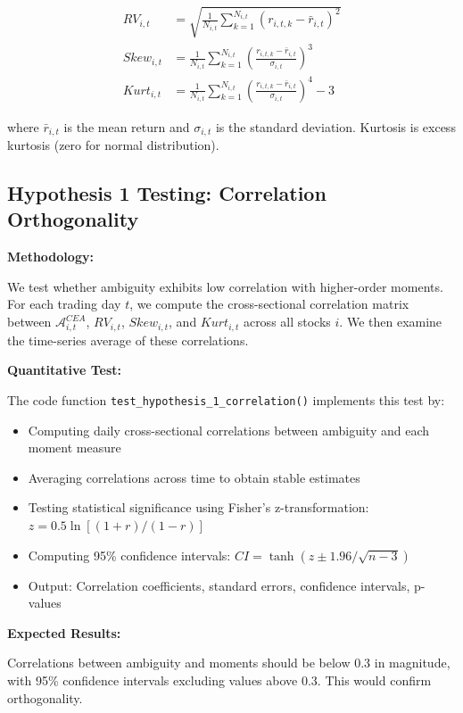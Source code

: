 \documentclass[preprint,12pt,authoryear]{elsarticle}
\begin{document}
\begin{align}
RV_{i,t} &= \sqrt{\frac{1}{N_{i,t}} \sum_{k=1}^{N_{i,t}} (r_{i,t,k} - \bar{r}_{i,t})^2} \\
Skew_{i,t} &= \frac{1}{N_{i,t}} \sum_{k=1}^{N_{i,t}} \left(\frac{r_{i,t,k} - \bar{r}_{i,t}}{\sigma_{i,t}}\right)^3 \\
Kurt_{i,t} &= \frac{1}{N_{i,t}} \sum_{k=1}^{N_{i,t}} \left(\frac{r_{i,t,k} - \bar{r}_{i,t}}{\sigma_{i,t}}\right)^4 - 3
\end{align}

where $\bar{r}_{i,t}$ is the mean return and $\sigma_{i,t}$ is the standard deviation. Kurtosis is excess kurtosis (zero for normal distribution).

\subsection{Hypothesis 1 Testing: Correlation Orthogonality}

\noindent
\textbf{Methodology:}

We test whether ambiguity exhibits low correlation with higher-order moments. For each trading day $t$, we compute the cross-sectional correlation matrix between $\mathcal{A}^{CEA}_{i,t}$, $RV_{i,t}$, $Skew_{i,t}$, and $Kurt_{i,t}$ across all stocks $i$. We then examine the time-series average of these correlations.

\noindent
\textbf{Quantitative Test:}

The code function \texttt{test\_hypothesis\_1\_correlation()} implements this test by:
\begin{itemize}
\item Computing daily cross-sectional correlations between ambiguity and each moment measure
\item Averaging correlations across time to obtain stable estimates
\item Testing statistical significance using Fisher's z-transformation: $z = 0.5 \ln[(1+r)/(1-r)]$
\item Computing 95\% confidence intervals: $CI = \tanh(z \pm 1.96/\sqrt{n-3})$
\item Output: Correlation coefficients, standard errors, confidence intervals, p-values
\end{itemize}

\noindent
\textbf{Expected Results:}

Correlations between ambiguity and moments should be below 0.3 in magnitude, with 95\% confidence intervals excluding values above 0.3. This would confirm orthogonality.
\end{document}
